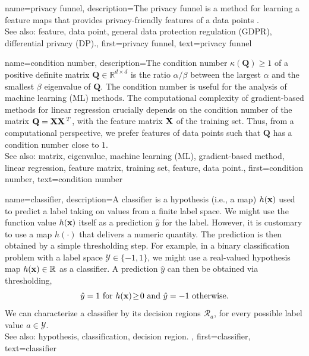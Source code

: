 {
{name={privacy funnel},
	description={The privacy funnel is a method for learning 
	a feature maps that provides privacy-friendly features of a 
	data points \cite{PrivacyFunnel}.
				\\ 
		See also: feature, data point, general data protection regulation (GDPR), differential privacy (DP).},
 	first={privacy funnel},
	text={privacy funnel} 
}


{name={condition number},
	description={The condition number $\kappa(\mathbf{Q}) \geq 1$ of a 
		positive definite matrix $\mathbf{Q} \in \mathbb{R}^{d \times d}$ is the ratio 
		$\alpha /\beta  $ between the largest $\alpha$ and the smallest $\beta$ eigenvalue of 
		$\mathbf{Q}$. The condition number is useful for the analysis of machine learning (ML) methods. 
		The computational complexity of gradient-based methods for linear regression crucially depends on the 
		condition number of the matrix $\mathbf{Q} = {\bf X} {\bf X}\,^{T}$, with the feature matrix ${\bf X}$ 
		of the training set. Thus, from a computational perspective, we prefer features of 
		data points such that $\mathbf{Q}$ has a condition number close to $1$.
					\\ 
		See also: matrix, eigenvalue, machine learning (ML), gradient-based method, linear regression, feature matrix, training set, feature, data point.},
	first={condition number},
	text={condition number} 
}

{name={classifier},
	description={A classifier is a hypothesis (i.e., a map) $h({\bf x})$ 
		used to predict a label taking on values from a finite label space. We might use the 
		function value $h({\bf x})$ itself as a prediction $\hat{y}$ for 
		the label. However, it is customary to use a map $h(\cdot)$ that delivers 
		a numeric quantity. The prediction is then obtained by a simple thresholding step. 
		For example, in a binary classification problem with a label space $\mathcal{Y} \in  \{ -1,1\}$, 
		we might use a real-valued hypothesis map $h({\bf x}) \in \mathbb{R}$ 
		as a classifier. A prediction $\hat{y}$ can then be obtained via thresholding,  
		 \begin{equation} 
		 	\label{equ_def_threshold_bin_classifier_dict}
		 	\hat{y} =1   \mbox{ for } h({\bf x})\!\geq\!0 \mbox{ and } 	\hat{y} =-1  \mbox{ otherwise.}
	 		\end{equation}
 		We can characterize a classifier by its decision regions $\mathcal{R}_{a}$, for 
 		every possible label value $a \in \mathcal{Y}$.
					\\ 
		See also: hypothesis, classification, decision region. },
	first={classifier},
	text={classifier} 
}

}
